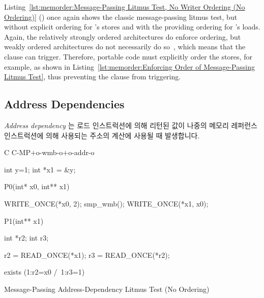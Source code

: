 Listing~\ref{lst:memorder:Message-Passing Litmus Test, No Writer Ordering (No Ordering)}
()
once again shows the classic message-passing litmus test, but without
explicit ordering for 's stores and with the 
providing ordering for 's loads.
Again, the relatively strongly ordered architectures do enforce ordering,
but weakly ordered architectures do not necessarily do
so~\cite{JadeAlglave2011ppcmem}, which means that the
 clause can trigger.
Therefore, portable code must explicitly order the stores, for
example, as shown in
Listing~\ref{lst:memorder:Enforcing Order of Message-Passing Litmus Test},
thus preventing the  clause from triggering.
\fi

\subsection{Address Dependencies}
\label{sec:memorder:Address Dependencies}

\emph{Address dependency} 는 로드 인스트럭션에 의해 리턴된 값이 나중의 메모리
레퍼런스 인스트럭션에 의해 사용되는 주소의 계산에 사용될 때 발생합니다.

\begin{listing}[tbp]
{ \scriptsize
\begin{verbbox}[\LstLineNo]
C C-MP+o-wmb-o+o-addr-o

{
int y=1;
int *x1 = &y;
}

P0(int* x0, int** x1) {

  WRITE_ONCE(*x0, 2);
  smp_wmb();
  WRITE_ONCE(*x1, x0);

}

P1(int** x1) {

  int *r2;
  int r3;

  r2 = READ_ONCE(*x1);
  r3 = READ_ONCE(*r2);

}

exists (1:r2=x0 /\ 1:r3=1)
\end{verbbox}
}
\centering
\theverbbox
\caption{Message-Passing Address-Dependency Litmus Test (No Ordering)}
\label{lst:memorder:Message-Passing Address-Dependency Litmus Test (No Ordering)}
\end{listing}

